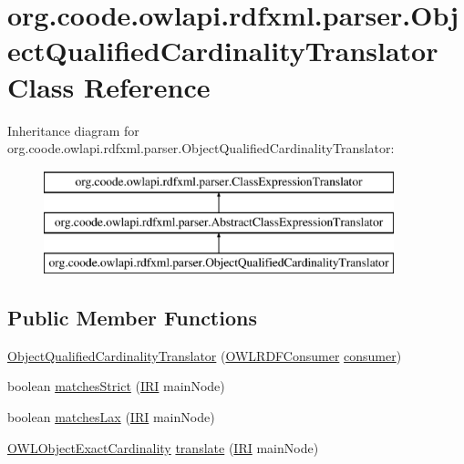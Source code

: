 \hypertarget{classorg_1_1coode_1_1owlapi_1_1rdfxml_1_1parser_1_1_object_qualified_cardinality_translator}{\section{org.\-coode.\-owlapi.\-rdfxml.\-parser.\-Object\-Qualified\-Cardinality\-Translator Class Reference}
\label{classorg_1_1coode_1_1owlapi_1_1rdfxml_1_1parser_1_1_object_qualified_cardinality_translator}
}
Inheritance diagram for org.\-coode.\-owlapi.\-rdfxml.\-parser.\-Object\-Qualified\-Cardinality\-Translator\-:\begin{figure}[H]
\begin{center}
\leavevmode
\includegraphics[height=3.000000cm]{classorg_1_1coode_1_1owlapi_1_1rdfxml_1_1parser_1_1_object_qualified_cardinality_translator}
\end{center}
\end{figure}
\subsection*{Public Member Functions}
\begin{DoxyCompactItemize}
\item 
\hyperlink{classorg_1_1coode_1_1owlapi_1_1rdfxml_1_1parser_1_1_object_qualified_cardinality_translator_a7cf65dffed8e484b36dc9880414be516}{Object\-Qualified\-Cardinality\-Translator} (\hyperlink{classorg_1_1coode_1_1owlapi_1_1rdfxml_1_1parser_1_1_o_w_l_r_d_f_consumer}{O\-W\-L\-R\-D\-F\-Consumer} \hyperlink{classorg_1_1coode_1_1owlapi_1_1rdfxml_1_1parser_1_1_abstract_class_expression_translator_ae547084cdd5b92c03835b5aa404f823b}{consumer})
\item 
boolean \hyperlink{classorg_1_1coode_1_1owlapi_1_1rdfxml_1_1parser_1_1_object_qualified_cardinality_translator_a4ef52070aa98c28ce3534d36e5bf06be}{matches\-Strict} (\hyperlink{classorg_1_1semanticweb_1_1owlapi_1_1model_1_1_i_r_i}{I\-R\-I} main\-Node)
\item 
boolean \hyperlink{classorg_1_1coode_1_1owlapi_1_1rdfxml_1_1parser_1_1_object_qualified_cardinality_translator_accae32b4edff06d79a21f49384b381c0}{matches\-Lax} (\hyperlink{classorg_1_1semanticweb_1_1owlapi_1_1model_1_1_i_r_i}{I\-R\-I} main\-Node)
\item 
\hyperlink{interfaceorg_1_1semanticweb_1_1owlapi_1_1model_1_1_o_w_l_object_exact_cardinality}{O\-W\-L\-Object\-Exact\-Cardinality} \hyperlink{classorg_1_1coode_1_1owlapi_1_1rdfxml_1_1parser_1_1_object_qualified_cardinality_translator_a72098e3aa0b88fd68c830215f019ec88}{translate} (\hyperlink{classorg_1_1semanticweb_1_1owlapi_1_1model_1_1_i_r_i}{I\-R\-I} main\-Node)
\end{DoxyCompactItemize}
